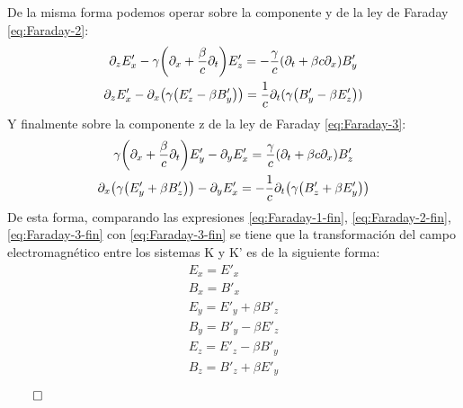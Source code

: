 \documentclass[11pt]{article}
\begin{document}
De la misma forma podemos operar sobre la componente y de la ley de Faraday \eqref{eq:Faraday-2}: 
\begin{gather}
    \partial_zE'_x - \gamma\qty(\partial_x + \dfrac{\beta}{c}\partial_t)E'_z  = -\dfrac{\gamma}{c}\qty(\partial_t  + \beta c \partial_x)B'_y\nonumber\\
    \partial_z E'_x - \partial_x\qty(\gamma\qty(E'_z - \beta B'_y))=\dfrac{1}{c}\partial_t(\gamma\qty(B'_y - \beta E'_z))\label{eq:Faraday-2-fin}
\end{gather}
Y finalmente sobre la componente z de la ley de Faraday \eqref{eq:Faraday-3}: 
\begin{gather}
    \gamma\qty(\partial_x +\dfrac{\beta}{c}\partial_t)E'_y - \partial_y E'_x = \dfrac{\gamma}{c} \qty (\partial_t + \beta c\partial_x)B'_z\nonumber\\
    \partial_x\qty(\gamma\qty(E'_y + \beta B'_z))-\partial_y E'_x = -\dfrac{1}{c}\partial_t\qty(\gamma\qty(B'_z + \beta E'_y))\label{eq:Faraday-3-fin}
\end{gather}
De esta forma, comparando las expresiones \eqref{eq:Faraday-1-fin}, \eqref{eq:Faraday-2-fin},\eqref{eq:Faraday-3-fin} con \eqref{eq:Faraday-3-fin} se tiene que la transformación del campo electromagnético entre los sistemas K y K' es de la siguiente forma:
\begin{eqnarray}
    E_x = E'_x\\
    B_x = B'_x\\
    E_y = E'_y +\beta B'_z\\
    B_y = B'_y - \beta E'_z\\
    E_z = E'_z -\beta B'_y\\
    B_z = B'_z + \beta E'_y
\end{eqnarray}
\begin{flushright}
 $\qed$   
\end{flushright}
\end{document}
